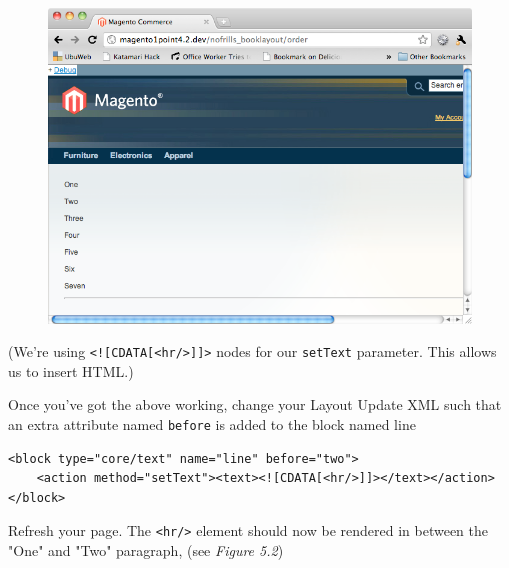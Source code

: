 \documentclass[oneside]{book}
\begin{document}
\begin{figure}[htb]
\begin{center}
\leavevmode
\includegraphics[width=1\textwidth]{images/chapter5/order-base.png}
\end{center}
\caption{}
\end{figure}


(We're using \footnotesize\texttt{\textless ![CDATA[\textless hr/\textgreater ]]\textgreater } \normalsize  nodes for our \footnotesize\texttt{setText} \normalsize  parameter. This allows us to insert HTML.)

Once you've got the above working, change your Layout Update XML such that an extra attribute named \footnotesize\texttt{before} \normalsize  is added to the block named line

\begin{lstlisting}
<block type="core/text" name="line" before="two">
    <action method="setText"><text><![CDATA[<hr/>]]></text></action>
</block>                                

\end{lstlisting}


Refresh your page.  The \footnotesize\texttt{\textless hr/\textgreater } \normalsize  element should now be rendered in between the "One" and "Two" paragraph, (see \emph{Figure 5.2}) 
\end{document}
